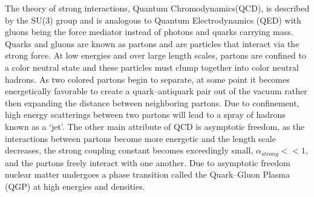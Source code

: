 \par
The theory of strong interactions, Quantum Chromodynamics(QCD), is described by the SU(3) group and is analogous to Quantum Electrodynamics (QED) with gluons being the force mediator instead of photons and quarks carrying mass.  Quarks and gluons are known as partons and are particles that interact via the strong force.  At low energies and over large length scales, partons are confined to a color neutral state and these particles must clump together into color neutral hadrons.  As two colored partons begin to separate, at some point it becomes energetically favorable to create a quark--antiquark pair out of the vacuum rather then expanding the distance between neighboring partons.  Due to confinement, high energy scatterings between two partons will lead to a spray of hadrons known as a `jet'.  The other main attribute of QCD is asymptotic freedom, as the interactions between partons become more energetic and the length scale decreases, the strong coupling constant becomes exceedingly small, $ \alpha_{strong} << 1$, and the partons freely interact with one another.  Due to asymptotic freedom nuclear matter undergoes a phase transition called the Quark--Gluon Plasma (QGP) at high energies and densities. 






